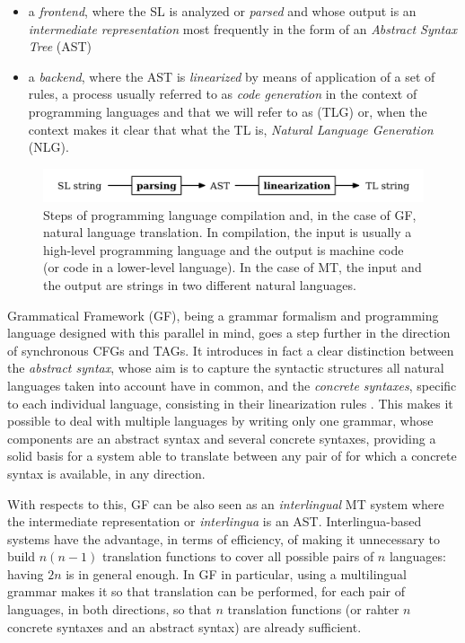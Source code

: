 \begin{itemize}
    \item a \textit{frontend}, where the SL is analyzed or \textit{parsed} and whose output is an \textit{intermediate representation} most frequently in the form of an \textit{Abstract Syntax Tree} (AST)
    \item a \textit{backend}, where the AST is \textit{linearized} by means of application of a set of rules, a process usually referred to as \textit{code generation} in the context of programming languages and that we will refer to as  (TLG) or, when the context makes it clear that what the TL is, \textit{Natural Language Generation} (NLG). \smallskip
\end{itemize}
\begin{figure}[H]
    \centering
    \includegraphics[width=.8\linewidth]{figure/compiler.png}
    \caption[Steps of programming language compilation and, in the case of GF, natural language translation]{Steps of programming language compilation and, in the case of GF, natural language translation. In compilation, the input is usually a high-level programming language and the output is machine code (or code in a lower-level language). In the case of MT, the input and the output are strings in two different natural languages.} \label{compilerd}
\end{figure}

Grammatical Framework (GF), being a grammar formalism and programming language designed with this parallel in mind, goes a step further in the direction of synchronous CFGs and TAGs. 
It introduces in fact a clear distinction between the \textit{abstract syntax}, whose aim is to capture the syntactic structures all natural languages taken into account have in common, and the \textit{concrete syntaxes}, specific to each individual language, consisting in their linearization rules \cite{gf2004} \cite{gfbook}. 
This makes it possible to deal with multiple languages by writing only one grammar, whose components are an abstract syntax and several concrete syntaxes, providing a solid basis for a system able to translate between any pair of for which a concrete syntax is available, in any direction. \smallskip

With respects to this, GF can be also seen as an \textit{interlingual} MT system where the intermediate representation or \textit{interlingua} is an AST. Interlingua-based systems have the advantage, in terms of efficiency, of making it unnecessary to build $n (n - 1)$ translation functions to cover all possible pairs of $n$ languages: having $2n$ is in general enough. In GF in particular, using a multilingual grammar makes it so that translation can be performed, for each pair of languages, in both directions, so that $n$ translation functions (or rahter $n$ concrete syntaxes and an abstract syntax) are already sufficient.\smallskip

